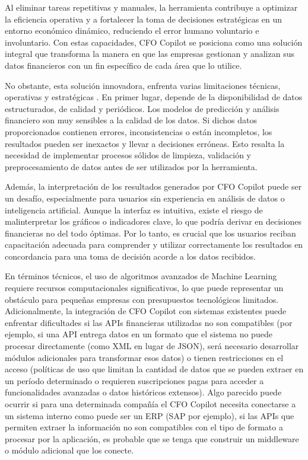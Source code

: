 \documentclass[12pt,letterpaper,oneside]{report}
\renewcommand{\_}{\UnderscoreOriginal\allowbreak}
\begin{document}
Al eliminar tareas repetitivas y manuales, la herramienta contribuye a optimizar la eficiencia operativa y a fortalecer la toma de decisiones estratégicas en un entorno económico dinámico, reduciendo el error humano voluntario e involuntario. Con estas capacidades, CFO Copilot se posiciona como una solución integral que transforma la manera en que las empresas gestionan y analizan sus datos financieros con un fin específico de cada área que lo utilice.

No obstante, esta solución innovadora, enfrenta varias limitaciones técnicas, operativas y estratégicas \parencite{Desai2024}. En primer lugar, depende de la disponibilidad de datos estructurados, de calidad y periódicos. Los modelos de predicción y análisis financiero son muy sensibles a la calidad de los datos. Si dichos datos proporcionados contienen errores, inconsistencias o están incompletos, los resultados pueden ser inexactos y llevar a decisiones erróneas. Esto resalta la necesidad de implementar procesos sólidos de limpieza, validación y preprocesamiento de datos antes de ser utilizados por la herramienta.

Además, la interpretación de los resultados generados por CFO Copilot puede ser un desafío, especialmente para usuarios sin experiencia en análisis de datos o inteligencia artificial. Aunque la interfaz es intuitiva, existe el riesgo de malinterpretar los gráficos o indicadores clave, lo que podría derivar en decisiones financieras no del todo óptimas. Por lo tanto, es crucial que los usuarios reciban capacitación adecuada para comprender y utilizar correctamente los resultados en concordancia para una toma de decisión acorde a los datos recibidos.

En términos técnicos, el uso de algoritmos avanzados de Machine Learning \parencite{Hoang2023} requiere recursos computacionales significativos, lo que puede representar un obstáculo para pequeñas empresas con presupuestos tecnológicos limitados. Adicionalmente, la integración de CFO Copilot con sistemas existentes puede enfrentar dificultades si las APIs financieras utilizadas no son compatibles (por ejemplo, si una API entrega datos en un formato que el sistema no puede procesar directamente (como XML en lugar de JSON), será necesario desarrollar módulos adicionales para transformar esos datos) o tienen restricciones en el acceso (políticas de uso que limitan la cantidad de datos que se pueden extraer en un período determinado o requieren suscripciones pagas para acceder a funcionalidades avanzadas o datos históricos extensos). Algo parecido puede ocurrir si para una determinada compañía el CFO Copilot necesita conectarse a un sistema interno como puede ser un ERP (SAP por ejemplo), si las APIs que permiten extraer la información no son compatibles con el tipo de formato a procesar por la aplicación, es probable que se tenga que construir un middleware o módulo adicional que los conecte.
\end{document}
